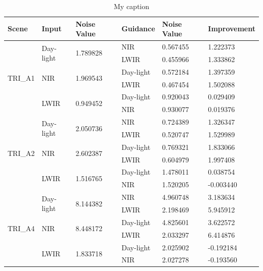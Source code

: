\documentclass[10pt,twocolumn,letterpaper]{article}
\begin{document}
\bgroup
\def\arraystretch{1.25}\setlength{\tabcolsep}{1.7em}
\begin{table}[]
	\centering
	\caption{My caption}
	\label{my-label}
	\begin{tabular}{llllll}
		\hline
		Scene                    & Input                      & Noise Value               & Guidance  & Noise Value & Improvement \\ \hline
		\multirow{6}{*}{TRI\_A1} & \multirow{2}{*}{Day-light} & \multirow{2}{*}{1.789828} & NIR       & 0.567455 & 1.222373    \\
		&                            &                           & LWIR      & 0.455966 & 1.333862    \\ \cline{2-6} 
		& \multirow{2}{*}{NIR}       & \multirow{2}{*}{1.969543} & Day-light & 0.572184 & 1.397359    \\
		&                            &                           & LWIR      & 0.467454 & 1.502088    \\ \cline{2-6} 
		& \multirow{2}{*}{LWIR}      & \multirow{2}{*}{0.949452} & Day-light & 0.920043 & 0.029409    \\
		&                            &                           & NIR       & 0.930077 & 0.019376    \\ \hline
		\multirow{6}{*}{TRI\_A2} & \multirow{2}{*}{Day-light} & \multirow{2}{*}{2.050736} & NIR       & 0.724389 & 1.326347    \\
		&                            &                           & LWIR      & 0.520747 & 1.529989    \\ \cline{2-6} 
		& \multirow{2}{*}{NIR}       & \multirow{2}{*}{2.602387} & Day-light & 0.769321 & 1.833066    \\
		&                            &                           & LWIR      & 0.604979 & 1.997408    \\ \cline{2-6} 
		& \multirow{2}{*}{LWIR}      & \multirow{2}{*}{1.516765} & Day-light & 1.478011 & 0.038754    \\
		&                            &                           & NIR       & 1.520205 & -0.003440   \\ \hline
		\multirow{6}{*}{TRI\_A4} & \multirow{2}{*}{Day-light} & \multirow{2}{*}{8.144382} & NIR       & 4.960748 & 3.183634    \\
		&                            &                           & LWIR      & 2.198469 & 5.945912    \\ \cline{2-6} 
		& \multirow{2}{*}{NIR}       & \multirow{2}{*}{8.448172} & Day-light & 4.825601 & 3.622572    \\
		&                            &                           & LWIR      & 2.033297 & 6.414876    \\ \cline{2-6} 
		& \multirow{2}{*}{LWIR}      & \multirow{2}{*}{1.833718} & Day-light & 2.025902 & -0.192184   \\
		&                            &                           & NIR       & 2.027278 & -0.193560   \\ \hline
	\end{tabular}
\end{table}
\egroup

{\small


}
\end{document}
